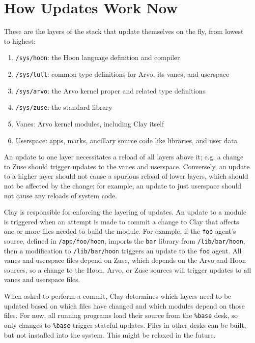 \documentclass[twoside]{article}
\begin{document}
\section{How Updates Work Now}

These are the layers of the stack that update themselves on the fly, from lowest to highest:

\begin{enumerate}
  \item  \texttt{/sys/hoon}: the Hoon language definition and compiler
  \item  \texttt{/sys/lull}: common type definitions for Arvo, its vanes, and userspace
  \item  \texttt{/sys/arvo}: the Arvo kernel proper and related type definitions
  \item  \texttt{/sys/zuse}: the standard library
  \item  Vanes: Arvo kernel modules, including Clay itself
  \item  Userspace:  apps, marks, ancillary source code like libraries, and user data
\end{enumerate}

An update to one layer necessitates a reload of all layers above it; e.g. a change to Zuse should trigger updates to the vanes and userspace. Conversely, an update to a higher layer should not cause a spurious reload of lower layers, which should not be affected by the change; for example, an update to just userspace should not cause any reloads of system code.

Clay is responsible for enforcing the layering of updates. An update to a module is triggered when an attempt is made to commit a change to Clay that affects one or more files needed to build the module. For example, if the \lstinline[style=inlinecode]{foo} agent's source, defined in \lstinline[style=inlinecode]{/app/foo/hoon}, imports the \lstinline[style=inlinecode]{bar} library from \lstinline[style=inlinecode]{/lib/bar/hoon}, then a modification to \lstinline[style=inlinecode]{/lib/bar/hoon} triggers an update to the \lstinline[style=inlinecode]{foo} agent. All vanes and userspace files depend on Zuse, which depends on the Arvo and Hoon sources, so a change to the Hoon, Arvo, or Zuse sources will trigger updates to all vanes and userspace files.

When asked to perform a commit, Clay determines which layers need to be updated based on which files have changed and which modules depend on those files. For now, all running programs load their source from the \lstinline[style=inlinecode]{%base} desk, so only changes to \lstinline[style=inlinecode]{%base} trigger stateful updates. Files in other desks can be built, but not installed into the system. This might be relaxed in the future.
\end{document}
